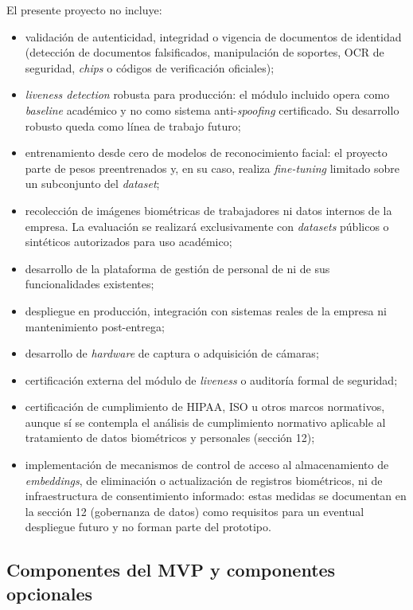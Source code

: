 \documentclass[
  11pt, %
]{charter}
\begin{document}
El presente proyecto no incluye:

\begin{itemize}
  \item validación de autenticidad, integridad o vigencia de documentos de identidad (detección de documentos falsificados, manipulación de soportes, OCR de seguridad, \textit{chips} o códigos de verificación oficiales);
  \item \textit{liveness detection} robusta para producción: el módulo incluido opera como \textit{baseline} académico y no como sistema anti-\textit{spoofing} certificado. Su desarrollo robusto queda como línea de trabajo futuro;
  \item entrenamiento desde cero de modelos de reconocimiento facial: el proyecto parte de pesos preentrenados y, en su caso, realiza \textit{fine-tuning} limitado sobre un subconjunto del \textit{dataset};
  \item recolección de imágenes biométricas de trabajadores ni datos internos de la empresa. La evaluación se realizará exclusivamente con \textit{datasets} públicos o sintéticos autorizados para uso académico;
  \item desarrollo de la plataforma de gestión de personal de \empclientename\hspace{1px} ni de sus funcionalidades existentes;
  \item despliegue en producción, integración con sistemas reales de la empresa ni mantenimiento post-entrega;
  \item desarrollo de \textit{hardware} de captura o adquisición de cámaras;
  \item certificación externa del módulo de \textit{liveness} o auditoría formal de seguridad;
  \item certificación de cumplimiento de HIPAA, ISO u otros marcos normativos, aunque sí se contempla el análisis de cumplimiento normativo aplicable al tratamiento de datos biométricos y personales (sección 12);
  \item implementación de mecanismos de control de acceso al almacenamiento de \textit{embeddings}, de eliminación o actualización de registros biométricos, ni de infraestructura de consentimiento informado: estas medidas se documentan en la sección 12 (gobernanza de datos) como requisitos para un eventual despliegue futuro y no forman parte del prototipo.
\end{itemize}

\subsection{Componentes del MVP y componentes opcionales}
\end{document}
